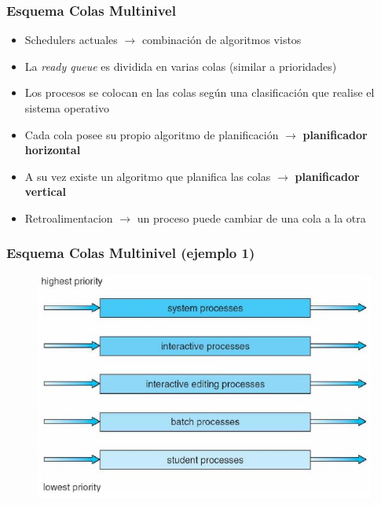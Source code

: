 \begin{frame}
  \frametitle{Esquema \textbf{Colas Multinivel}}
  \begin{itemize}
  		\item Schedulers actuales $\rightarrow$ combinación de algoritmos vistos
		\item La \emph{ready queue} es dividida en varias colas (similar a prioridades)		
		\item Los procesos se colocan en las colas según una clasificación que realise el sistema operativo
		\item Cada cola posee su propio algoritmo de planificación $\rightarrow$ \textbf{planificador horizontal}
		\item A su vez existe un algoritmo que planifica las colas $\rightarrow$ \textbf{planificador vertical}
		\item Retroalimentacion $\rightarrow$ un proceso puede cambiar de una cola a la otra
  \end{itemize}
\end{frame}

\begin{frame}
  \frametitle{Esquema \textbf{Colas Multinivel} (ejemplo 1)}
	\begin{figure}
	    \includegraphics[scale=0.4]{images/multilevelSchemaExample1.png}
	\end{figure}
\end{frame}

